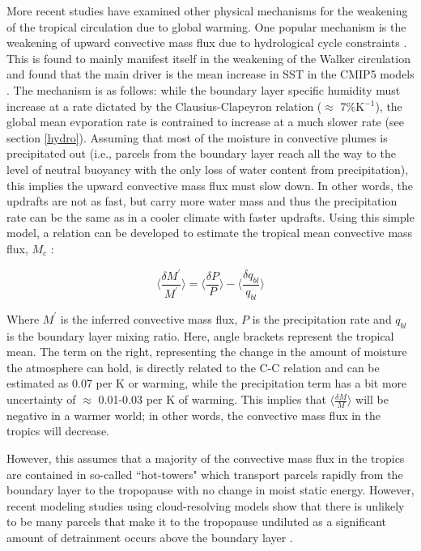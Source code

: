 \documentclass[letterpaper,12pt,titlepage,oneside,final]{book}
\begin{document}
More recent studies have examined other physical mechanisms for the weakening of the tropical circulation due to global warming. One popular mechanism is the weakening of upward convective mass flux due to hydrological cycle constraints \citep{held_robust_2006,vecchi_global_2007,chadwick_spatial_2012}. This is found to mainly manifest itself in the weakening of the Walker circulation \citep{held_robust_2006,vecchi_global_2007} and \citep{he_anthropogenic_2015} found that the main driver is the mean increase in SST in the CMIP5 models \citep{taylor_overview_2011}. The mechanism is as follows: while the boundary layer specific humidity must increase at a rate dictated by the Clausius-Clapeyron relation ($\approx$ 7\%K$^{-1}$), the global mean evporation rate is contrained to increase at a much slower rate (see section \ref{hydro}). Assuming that most of the moisture in convective plumes is precipitated out (i.e., parcels from the boundary layer reach all the way to the level of neutral buoyancy with the only loss of water content from precipitation), this implies the upward convective mass flux must slow down. In other words, the updrafts are not as fast, but carry more water mass and thus the precipitation rate can be the same as in a cooler climate with faster updrafts. Using this simple model, a relation can be developed to estimate the tropical mean convective mass flux, 
$M_{c}$ \citep{held_robust_2006}:

\begin{equation}\label{eq:HS}
\Bigg\langle\frac{\delta{M^{'}}}{M^{'}}\Bigg\rangle=\Bigg\langle\frac{\delta{P}}{P}\Bigg\rangle-\Bigg\langle\frac{\delta{q_{bl}}}{q_{bl}}\Bigg\rangle
\end{equation}

Where $M^{'}$ is the inferred convective mass flux, $P$ is the precipitation rate and $q_{bl}$ is the boundary layer mixing ratio. Here, angle brackets represent the tropical mean. The term on the right, representing the change in the amount of moisture the atmosphere can hold, is directly related to the C-C relation and can be estimated as 0.07 per K or warming, while the precipitation term has a bit more uncertainty of $\approx$ 0.01-0.03 per K of warming. This implies that $\langle\frac{\delta{M}}{M}\rangle$ will be negative in a warmer world; in other words, the convective mass flux in the tropics will decrease. 

However, this assumes that a majority of the convective mass flux in the tropics are contained in so-called ``hot-towers" \citep{riehl_and_malkus_heat_1958} which transport parcels rapidly from the boundary layer to the tropopause with no change in moist static energy. However, recent modeling studies using cloud-resolving models show that there is unlikely to be many parcels that make it to the tropopause undiluted \citep{romps_undiluted_2010} as a significant amount of detrainment occurs above the boundary layer \citep{romps_direct_2010}. 
\end{document}
